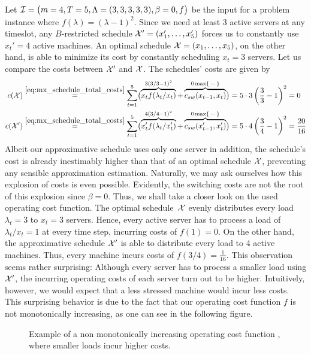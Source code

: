 \begin{exmpl}
Let $\mathcal{I}=\bigl(m=4,T=5,\Lambda=(3,3,3,3,3),\beta=0,f\bigr)$ be the input for a problem instance where $f(\lambda)=(\lambda-1)^2$. Since we need at least 3 active servers at any timeslot, any $B$-restricted schedule $\mathcal{X}'=(x_1',\dotsc,x_5')$ forces us to constantly use $x_t'=4$ active machines. An optimal schedule $\mathcal{X}=(x_1,\dotsc,x_5)$, on the other hand, is able to minimize its cost by constantly scheduling $x_t=3$ servers. Let us compare the costs between $\mathcal{X}'$ and $\mathcal{X}$. The schedules' costs are given by
\begin{align*}
	c(\mathcal{X})&\stackrel{\eqref{eq:mx_schedule_total_costs}}{=}\sum\limits_{t=1}^{5}\bigl(\overbrace{x_tf(\lambda_t/x_t)}^{3(3/3-1)^2}+\overbrace{c_{sw}(x_{t-1},x_t)}^{0\max\{\,\cdots\}}\bigr)=5\cdot3\left(\frac{3}{3}-1\right)^2=0\\
	c(\mathcal{X}')&\stackrel{\eqref{eq:mx_schedule_total_costs}}{=}\sum\limits_{t=1}^{5}\bigl(\overbrace{x_t'f(\lambda_t/x_t')}^{4(3/4-1)^2}+\overbrace{c_{sw}(x_{t-1}',x_t')}^{0\max\{\,\cdots\}}\bigr)=5\cdot4\left(\frac{3}{4}-1\right)^2=\frac{20}{16} 
\end{align*}
Albeit our approximative schedule uses only one server in addition, the schedule's cost is already inestimably higher than that of an optimal schedule $\mathcal{X}$, preventing any sensible approximation estimation. Naturally, we may ask ourselves how this explosion of costs is even possible. Evidently, the switching costs are not the root of this explosion since $\beta=0$. Thus, we shall take a closer look on the used operating cost function. The optimal schedule~$\mathcal{X}$ evenly distributes every load $\lambda_t=3$ to $x_t=3$ servers. Hence, every active server has to process a load of $\lambda_t/x_t=1$ at every time step, incurring costs of $f(1)=0$. On the other hand, the approximative schedule $\mathcal{X}'$ is able to distribute every load to 4 active machines. Thus, every machine incurs costs of $f(3/4)=\frac{1}{16}$. This observation seems rather surprising: Although every server has to process a smaller load using $\mathcal{X}'$, the incurring operating costs of each server turn out to be higher. Intuitively, however, we would expect that a less stressed machine would incur less costs. This surprising behavior is due to the fact that our operating cost function $f$ is not monotonically increasing, as one can see in the following figure.
\begin{figure}[H]
\centering

\caption{Example of a non monotonically increasing operating cost function , where smaller loads incur higher costs.}
\label{fig:non_mono_incr_f}
\end{figure}
\end{exmpl}

